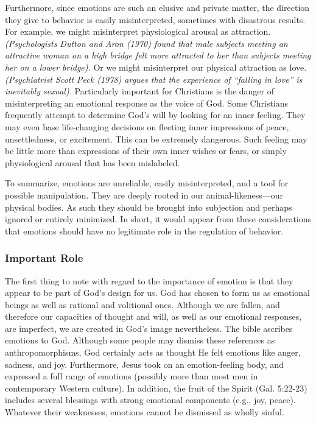 \documentclass[
]{book}
\begin{document}
Furthermore, since emotions are such an elusive and private matter, the direction they give to behavior is easily misinterpreted, sometimes with disastrous results. For example, we might misinterpret physiological arousal as attraction. \emph{(Psychologists Dutton and Aron (1970) found that male subjects meeting an attractive woman on a high bridge felt more attracted to her than subjects meeting her on a lower bridge).} Or we might misinterpret our physical attraction as love. \emph{(Psychiatrist Scott Peck (1978) argues that the experience of ``falling in love'' is inevitably sexual).} Particularly important for Christians is the danger of misinterpreting an emotional response as the voice of God. Some Christians frequently attempt to determine God's will by looking for an inner feeling. They may even base life-changing decisions on fleeting inner impressions of peace, unsettledness, or excitement. This can be extremely dangerous. Such feeling may be little more than expressions of their own inner wishes or fears, or simply physiological arousal that has been mislabeled.

To summarize, emotions are unreliable, easily misinterpreted, and a tool for possible manipulation. They are deeply rooted in our animal-likeness---our physical bodies. As such they should be brought into subjection and perhaps ignored or entirely minimized. In short, it would appear from these considerations that emotions should have no legitimate role in the regulation of behavior.

\hypertarget{important-role}{%
\subsubsection*{Important Role}\label{important-role}}

The first thing to note with regard to the importance of emotion is that they appear to be part of God's design for us. God has chosen to form us as emotional beings as well as rational and volitional ones. Although we are fallen, and therefore our capacities of thought and will, as well as our emotional responses, are imperfect, we are created in God's image nevertheless. The bible ascribes emotions to God. Although some people may dismiss these references as anthropomorphisms, God certainly acts as thought He felt emotions like anger, sadness, and joy. Furthermore, Jesus took on an emotion-feeling body, and expressed a full range of emotions (possibly more than most men in contemporary Western culture). In addition, the fruit of the Spirit (Gal. 5:22-23) includes several blessings with strong emotional components (e.g., joy, peace). Whatever their weaknesses, emotions cannot be dismissed as wholly sinful.
\end{document}
